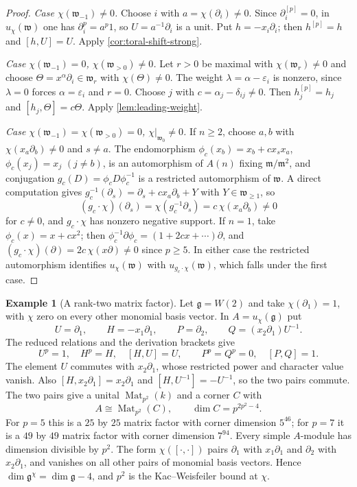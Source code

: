 \documentclass[11pt,reqno]{amsart}
\theoremstyle{definition}
\theoremstyle{remark}
\theoremstyle{definition}
\newtheorem{example}[example]{Example}
\newcommand{\Mat}{\operatorname{Mat}}
\begin{document}
\begin{proof}
\emph{Case $\chi(\mathfrak w_{-1})\ne0$.}  Choose $i$ with
$a=\chi(\partial_i)\ne0$.  Since $\partial_i^{[p]}=0$, in $u_\chi(\mathfrak
w)$ one has $\partial_i^p=a^p1$, so $U=a^{-1}\partial_i$ is a unit.  Put
$h=-x_i\partial_i$; then $h^{[p]}=h$ and $[h,U]=U$.  Apply
\cref{cor:toral-shift-strong}.

\emph{Case $\chi(\mathfrak w_{-1})=0$, $\chi(\mathfrak w_{>0})\ne0$.}  Let
$r>0$ be maximal with $\chi(\mathfrak w_r)\ne0$ and choose
$\Theta=x^\alpha\partial_i\in\mathfrak w_r$ with $\chi(\Theta)\ne0$.  The
weight $\lambda=\alpha-\varepsilon_i$ is nonzero, since $\lambda=0$ forces
$\alpha=\varepsilon_i$ and $r=0$.  Choose $j$ with
$c=\alpha_j-\delta_{ij}\ne0$.  Then $h_j^{[p]}=h_j$ and
$[h_j,\Theta]=c\Theta$.  Apply \cref{lem:leading-weight}.

\emph{Case $\chi(\mathfrak w_{-1})=\chi(\mathfrak w_{>0})=0$,
$\chi|_{\mathfrak w_0}\ne0$.}  If $n\ge2$, choose $a,b$ with
$\chi(x_a\partial_b)\ne0$ and $s\ne a$.  The endomorphism
$\phi_c(x_b)=x_b+cx_sx_a$, $\phi_c(x_j)=x_j$ $(j\ne b)$, is an automorphism
of $A(n)$ fixing $\mathfrak m/\mathfrak m^2$, and conjugation
$g_c(D)=\phi_cD\phi_c^{-1}$ is a restricted automorphism of $\mathfrak w$.
A direct computation gives
$g_c^{-1}(\partial_s)=\partial_s+cx_a\partial_b+Y$ with $Y\in\mathfrak
w_{\ge1}$, so
\[
 (g_c\cdot\chi)(\partial_s)=\chi(g_c^{-1}\partial_s)=c\,\chi(x_a\partial_b)\ne0
\]
for $c\ne0$, and $g_c\cdot\chi$ has nonzero negative support.  If $n=1$,
take $\phi_c(x)=x+cx^2$; then
$\phi_c^{-1}\partial\phi_c=(1+2cx+\cdots)\partial$, and
$(g_c\cdot\chi)(\partial)=2c\,\chi(x\partial)\ne0$ since $p\ge5$.  In either
case the restricted automorphism identifies $u_\chi(\mathfrak w)$ with
$u_{g_c\cdot\chi}(\mathfrak w)$, which falls under the first case.
\end{proof}

\begin{example}[A rank-two matrix factor]\label{ex:w2-negative}
Let $\mathfrak g=W(2)$ and take $\chi(\partial_1)=1$, with
$\chi$ zero on every other monomial basis vector. In $A=u_\chi(\mathfrak g)$ put
\[
 U=\partial_1,\qquad H=-x_1\partial_1,\qquad
 P=\partial_2,\qquad Q=(x_2\partial_1)U^{-1}.
\]
The reduced relations and the derivation brackets give
\[
 U^p=1,\quad H^p=H,\quad [H,U]=U,\qquad
 P^p=Q^p=0,\quad [P,Q]=1.
\]
The element $U$ commutes with $x_2\partial_1$, whose restricted power
and character value vanish. Also $[H,x_2\partial_1]=x_2\partial_1$
and $[H,U^{-1}]=-U^{-1}$, so the two pairs commute.
The two pairs give a unital $\Mat_{p^2}(k)$ and a corner $C$ with
\[
 A\cong\Mat_{p^2}(C),\qquad \dim C=p^{2p^2-4}.
\]
For $p=5$ this is a $25$ by $25$ matrix factor with corner dimension
$5^{46}$; for $p=7$ it is a $49$ by $49$ matrix factor with corner
dimension $7^{94}$. Every simple $A$-module has dimension divisible by $p^2$.
The form $\chi([\cdot,\cdot])$ pairs $\partial_1$ with $x_1\partial_1$
and $\partial_2$ with $x_2\partial_1$, and vanishes on all other pairs
of monomial basis vectors. Hence $\dim\mathfrak g^\chi=\dim\mathfrak g-4$,
and $p^2$ is the Kac--Weisfeiler bound at $\chi$.
\end{example}
\end{document}
